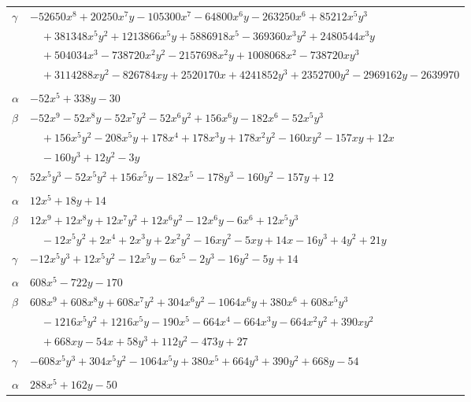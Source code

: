\documentclass[11pt]{article}
\begin{document}
\begin{longtable}{@{}ll@{}}
$\gamma$ & $-52650x^{8}+20250x^{7}y-105300x^{7}-64800x^{6}y-263250x^{6}+85212x^{5}y^{3}$\\
 & $\quad +381348x^{5}y^{2}+1213866x^{5}y+5886918x^{5}-369360x^{3}y^{2}+2480544x^{3}y$\\
 & $\quad +504034x^{3}-738720x^{2}y^{2}-2157698x^{2}y+1008068x^{2}-738720xy^{3}$\\
 & $\quad +3114288xy^{2}-826784xy+2520170x+4241852y^{3}+2352700y^{2}-2969162y-2639970$\\
\addlinespace[3pt]
\multicolumn{2}{@{}l}{$\{i,j\}=\{8,28\}$, $k_{ij}=2\cdot 3$}\\
$\alpha$ & $-52x^{5}+338y-30$\\
$\beta$ & $-52x^{9}-52x^{8}y-52x^{7}y^{2}-52x^{6}y^{2}+156x^{6}y-182x^{6}-52x^{5}y^{3}$\\
 & $\quad +156x^{5}y^{2}-208x^{5}y+178x^{4}+178x^{3}y+178x^{2}y^{2}-160xy^{2}-157xy+12x$\\
 & $\quad -160y^{3}+12y^{2}-3y$\\
$\gamma$ & $52x^{5}y^{3}-52x^{5}y^{2}+156x^{5}y-182x^{5}-178y^{3}-160y^{2}-157y+12$\\
\addlinespace[3pt]
\multicolumn{2}{@{}l}{$\{i,j\}=\{8,29\}$, $k_{ij}=2\cdot 7$}\\
$\alpha$ & $12x^{5}+18y+14$\\
$\beta$ & $12x^{9}+12x^{8}y+12x^{7}y^{2}+12x^{6}y^{2}-12x^{6}y-6x^{6}+12x^{5}y^{3}$\\
 & $\quad -12x^{5}y^{2}+2x^{4}+2x^{3}y+2x^{2}y^{2}-16xy^{2}-5xy+14x-16y^{3}+4y^{2}+21y$\\
$\gamma$ & $-12x^{5}y^{3}+12x^{5}y^{2}-12x^{5}y-6x^{5}-2y^{3}-16y^{2}-5y+14$\\
\addlinespace[3pt]
\multicolumn{2}{@{}l}{$\{i,j\}=\{8,30\}$, $k_{ij}=2^{5}\cdot 7$}\\
$\alpha$ & $608x^{5}-722y-170$\\
$\beta$ & $608x^{9}+608x^{8}y+608x^{7}y^{2}+304x^{6}y^{2}-1064x^{6}y+380x^{6}+608x^{5}y^{3}$\\
 & $\quad -1216x^{5}y^{2}+1216x^{5}y-190x^{5}-664x^{4}-664x^{3}y-664x^{2}y^{2}+390xy^{2}$\\
 & $\quad +668xy-54x+58y^{3}+112y^{2}-473y+27$\\
$\gamma$ & $-608x^{5}y^{3}+304x^{5}y^{2}-1064x^{5}y+380x^{5}+664y^{3}+390y^{2}+668y-54$\\
\addlinespace[3pt]
\multicolumn{2}{@{}l}{$\{i,j\}=\{8,31\}$, $k_{ij}=2^{5}\cdot 7$}\\
$\alpha$ & $288x^{5}+162y-50$\\

\end{longtable}
\end{document}
